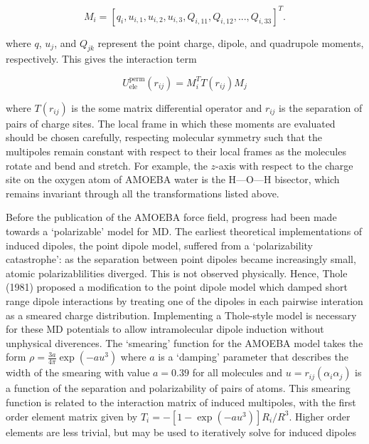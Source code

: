 \begin{equation}\label{eqn:polytensor}
    M_i = [q_i, u_{i,1}, u_{i,2}, u_{i,3}, Q_{i,11}, Q_{i,12}, ..., Q_{i,33}]^T.
\end{equation}

where $q$, $u_j$, and $Q_{jk}$ represent the point charge, dipole, and quadrupole moments, respectively.
This gives the interaction term 

\begin{equation}\label{eqn:perm-ele}
    U^\mathrm{perm}_\mathrm{ele}(r_{ij}) = M_i^TT(r_{ij})M_j
\end{equation}

where $T(r_{ij})$ is the some matrix differential operator and $r_{ij}$ is the separation of pairs of charge sites.
The local frame in which these moments are evaluated should be chosen carefully, respecting molecular symmetry
such that the multipoles remain constant with respect to their local frames as the molecules rotate and
bend and stretch.
For example, the $z$-axis with respect to the charge site on the oxygen atom of AMOEBA water is the 
H---O---H bisector, which remains invariant through all the transformations listed above.

\par
Before the publication of the AMOEBA force field, progress had been made towards a `polarizable' model for 
MD.
The earliest theoretical implementations of induced dipoles, the point dipole model,
suffered from a `polarizability catastrophe':
as the separation between point dipoles became increasingly small, atomic polarizablilities
diverged.
This is not observed physically.
Hence, Thole (1981) \cite{thole1981} proposed a modification to the point dipole model which damped short range dipole interactions
by treating one of the dipoles in each pairwise interation as a smeared charge distribution.
Implementing a Thole-style model is necessary for these MD potentials to allow intramolecular dipole induction
without unphysical diverences.
The `smearing' function for the AMOEBA model takes the form $\rho = \frac{3a}{4\pi}\exp(-au^3)$ where $a$ is
a `damping' parameter that describes the width of the smearing with value $a = 0.39$ for all molecules and 
$u = r_{ij}(\alpha_i\alpha_j)$ is a function of the separation and polarizability of pairs of atoms.
This smearing function is related to the interaction matrix of induced multipoles, with the first order element
matrix given by $T_i = -[1-\exp(-au^3)]R_i/R^3$.
Higher order elements are less trivial, but may be used to iteratively solve for induced dipoles 

